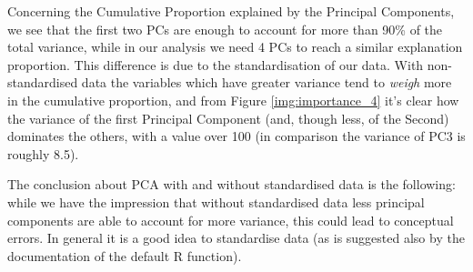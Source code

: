 \documentclass[a4paper,11pt,oneside]{report}
\begin{document}
	Concerning the Cumulative Proportion explained by the Principal Components, we see that the first two PCs are enough to account for more than 90\% of the total variance, while in our analysis we need 4 PCs to reach a similar explanation proportion.
	This difference is due to the standardisation of our data. With non-standardised data the variables which have greater variance tend to \textit{weigh} more in the cumulative proportion, and from Figure \ref{img:importance_4} it's clear how the variance of the first Principal Component (and, though less, of the Second) dominates the others, with a value over 100 (in comparison the variance of PC3 is roughly 8.5).

The conclusion about PCA with and without standardised data is the following: while we have the impression that without standardised data less principal components are able to account for more variance, this could lead to conceptual errors. In general it is a good idea to standardise data (as is suggested also by the documentation of the default R function).
	
\end{document}
